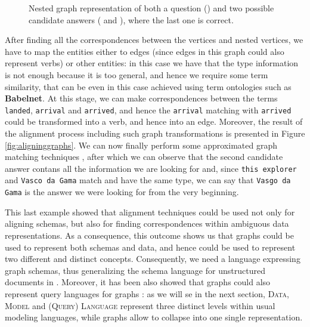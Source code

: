 \begin{example}
\begin{figure}[!p]
	\caption{Nested graph representation of both a question () and two possible candidate answers ( and ), where the last one is correct.}
	\label{fig:firstnested}
\end{figure}
	After finding all the correspondences between the vertices and nested vertices, we have to map the  entities either to edges (since edges in this graph could also represent verbs) or other entities: in this case we have that the type information is not enough because it is too general, and hence we require some term similarity, that can be even in this case achieved using term ontologies such as \textbf{Babelnet}. At this stage, we can make correspondences between the terms \texttt{landed}, \texttt{arrival} and \texttt{arrived}, and hence the \texttt{arrival} matching with \texttt{arrived} could be transformed into a verb, and hence into an edge. 
	Moreover, the result of the alignment process including such graph transformations is presented in Figure \ref{fig:aligninggraphs}. We can now finally perform some approximated graph matching techniques \cite{VirgilioMT15,Aligon201520}, after which we can observe that the second candidate answer contans all the information we are looking for and, since \texttt{this explorer} and \texttt{Vasco da Gama} match and have the same type, we can say that \texttt{Vasgo da Gama} is the answer we were looking for from the very beginning.
\end{example}

This last example showed that alignment techniques could  be used not only for aligning schemas, but also for finding correspondences within ambiguous data representations. As a consequence, this outcome shows us that graphs could be used to represent both schemas and data, and hence could be used to represent two different and distinct concepts. Consequently, we need a language expressing graph schemas, thus generalizing the schema language for unstructured documents in \cite{BaaziziLCGS17}. Moreover, it has been also showed that graphs could also represent query languages for graphs \cite{consens1990a,GraphLogAggr,n3,Goertzel2014}: as we will se in the next section, \textsc{Data}, \textsc{Model} and \textsc{(Query) Language} represent three distinct levels within usual modeling languages, while graphs allow to collapse into one single representation.

